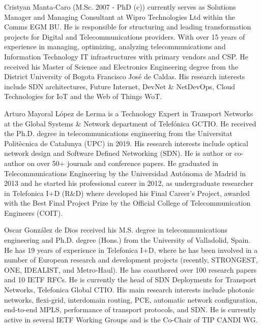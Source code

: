 \documentclass[10pt, conference]{IEEEtran}
\begin{document}
\begin{IEEEbiography}%
{Cristyan Manta-Caro} (M.Sc. 2007 - PhD (c)) currently serves as Solutions Manager and Managing Consultant at Wipro Technologies Ltd within the Comms EGM BU. He is responsible for structuring and leading transformation projects for Digital and Telecommunications providers. With over 15 years of experience in managing, optimizing, analyzing telecommunications and Information Technology IT infrastructures with primary vendors and CSP. He received his Master of Science and Electronics Engineering degree from the District University of Bogota Francisco Jos\'e de Caldas. His research interests include SDN architectures, Future Internet, DevNet \& NetDevOps, Cloud Technologies for IoT and the Web of Things WoT.\end{IEEEbiography}

\begin{IEEEbiography}Arturo Mayoral López de Lerma is a Technology Expert in Transport Networks at the Global Systems \& Network department of Telefónica GCTIO. He received the Ph.D. degree in telecommunications engineering from the Universitat Politècnica de Catalunya (UPC) in 2019. His  research  interests  include  optical network design and Software Defined Networking (SDN). He is author or co-author on over 50+ journals and conference papers. He graduated in Telecommunications Engineering by the Universidad Autónoma de Madrid in 2013 and he started his professional career in 2012, as undergraduate researcher in Telefonica I+D (R\&D) where developed his Final Career’s Project, awarded with the Best Final Project Prize by the Official College of Telecommunication Engineers (COIT).\end{IEEEbiography}

\begin{IEEEbiography}Oscar González de Dios received his M.S. degree in telecommunications engineering and Ph.D. degree (Hons.) from the University of Valladolid, Spain. He has 19 years of experience in Telefonica I+D, where he has been involved in a number of European research and development projects (recently, STRONGEST, ONE, IDEALIST, and Metro-Haul). He has coauthored over 100 research papers and 10 IETF RFCs. He is currently the head of SDN Deployments for Transport Networks, Telefonica Global CTIO. His main research interests include photonic networks, flexi-grid, interdomain routing, PCE, automatic network configuration, end-to-end MPLS, performance of transport protocols, and SDN. He is currently active in several IETF Working Groups and is the Co-Chair of TIP CANDI WG.\end{IEEEbiography}
\end{document}
